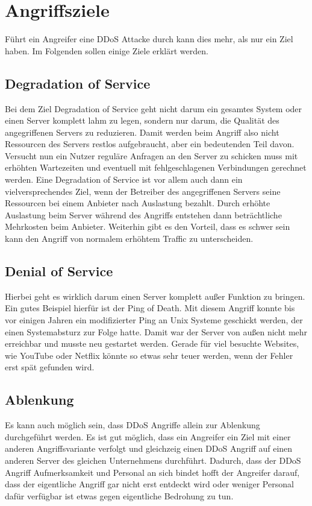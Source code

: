\chapter{Angriffsziele}
\label{chap:kapitel4}

Führt ein Angreifer eine DDoS Attacke durch kann dies mehr, als nur ein Ziel haben. Im Folgenden sollen einige Ziele erklärt werden.

\section{Degradation of Service}

Bei  dem Ziel Degradation of Service geht nicht darum ein gesamtes System oder einen Server komplett lahm zu legen, sondern nur darum, die Qualität des angegriffenen Servers zu reduzieren. Damit werden beim Angriff also nicht Ressourcen des Servers restlos aufgebraucht, aber ein bedeutenden Teil davon. Versucht nun ein Nutzer reguläre Anfragen an den Server zu schicken muss mit erhöhten Wartezeiten und eventuell mit fehlgeschlagenen Verbindungen gerechnet werden. Eine Degradation of Service ist vor allem auch dann ein vielversprechendes Ziel, wenn der Betreiber des angegriffenen Servers seine Ressourcen bei einem Anbieter nach Auslastung bezahlt. Durch erhöhte Auslastung beim Server während des Angriffs entstehen dann beträchtliche Mehrkosten beim Anbieter. Weiterhin gibt es den Vorteil, dass es schwer sein kann den Angriff von normalem erhöhtem Traffic zu unterscheiden.

\section{Denial of Service}

Hierbei geht es wirklich darum einen Server komplett außer Funktion zu bringen. Ein gutes Beispiel hierfür ist der Ping of Death. Mit diesem Angriff konnte bis vor einigen Jahren ein modifizierter Ping an Unix Systeme geschickt werden, der einen Systemabsturz zur Folge hatte. Damit war der Server von außen nicht mehr erreichbar und musste neu gestartet werden. Gerade für viel besuchte Websites, wie YouTube oder Netflix könnte so etwas sehr teuer werden, wenn der Fehler erst spät gefunden wird.

\section{Ablenkung}

Es kann auch möglich sein, dass DDoS Angriffe allein zur Ablenkung durchgeführt werden. Es ist gut möglich, dass ein Angreifer ein Ziel mit einer anderen Angriffsvariante verfolgt und gleichzeig einen DDoS Angriff auf einen anderen Server des gleichen Unternehmens durchführt. Dadurch, dass der DDoS Angriff Aufmerksamkeit und Personal an sich bindet hofft der Angreifer darauf, dass der eigentliche Angriff gar nicht erst entdeckt wird oder  weniger Personal dafür verfügbar ist etwas gegen eigentliche Bedrohung zu tun.

